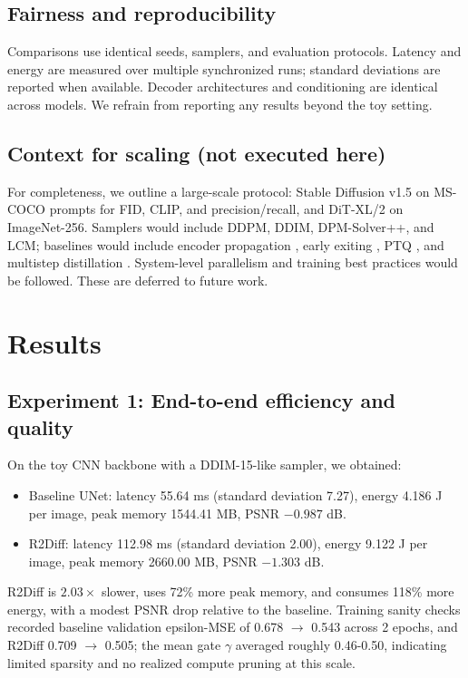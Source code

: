 \documentclass{article}
\begin{document}
\subsection{Fairness and reproducibility}
Comparisons use identical seeds, samplers, and evaluation protocols. Latency and energy are measured over multiple synchronized runs; standard deviations are reported when available. Decoder architectures and conditioning are identical across models. We refrain from reporting any results beyond the toy setting.

\subsection{Context for scaling (not executed here)}
For completeness, we outline a large-scale protocol: Stable Diffusion v1.5 on MS-COCO prompts for FID, CLIP, and precision/recall, and DiT-XL/2 on ImageNet-256. Samplers would include DDPM, DDIM, DPM-Solver++, and LCM; baselines would include encoder propagation \cite{li-2023-faster}, early exiting \cite{moon-2024-simple}, PTQ \cite{shang-2022-post}, and multistep distillation \cite{salimans-2024-multistep}. System-level parallelism \cite{li-2024-distrifusion} and training best practices \cite{karras-2023-analyzing} would be followed. These are deferred to future work.

\section{Results}
\subsection{Experiment 1: End-to-end efficiency and quality}
On the toy CNN backbone with a DDIM-15-like sampler, we obtained:
\begin{itemize}
  \item Baseline UNet: latency 55.64 ms (standard deviation 7.27), energy 4.186 J per image, peak memory 1544.41 MB, PSNR $-0.987$ dB.
  \item R2Diff: latency 112.98 ms (standard deviation 2.00), energy 9.122 J per image, peak memory 2660.00 MB, PSNR $-1.303$ dB.
\end{itemize}
R2Diff is $2.03\times$ slower, uses 72\% more peak memory, and consumes 118\% more energy, with a modest PSNR drop relative to the baseline. Training sanity checks recorded baseline validation epsilon-MSE of 0.678 $\rightarrow$ 0.543 across 2 epochs, and R2Diff 0.709 $\rightarrow$ 0.505; the mean gate $\gamma$ averaged roughly 0.46-0.50, indicating limited sparsity and no realized compute pruning at this scale.
\end{document}
